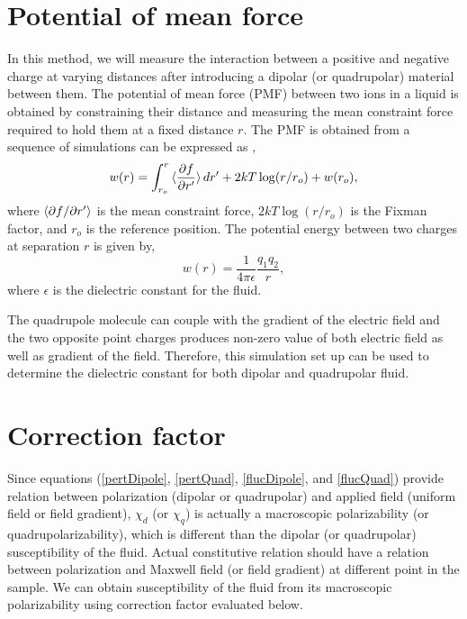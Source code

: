\section{Potential of mean force}
In this method, we will measure the interaction between a positive and negative charge at varying distances after introducing a dipolar (or quadrupolar) material between them. The potential of mean force (PMF) between two ions in a liquid is obtained by constraining their distance and measuring the mean constraint force required to hold them at a fixed distance $r.$ The PMF  is obtained from a sequence of simulations can be expressed as \cite{Wilfred07},
\begin{equation}
w(r) = \int_{r_o}^{r}\braket{\frac{\partial f}{\partial r'}}dr' + 2kT \log(r/r_o) + w(r_o),
\label{eq:pmf}
\end{equation}
where $\braket{\partial f/\partial r'}$ is the mean constraint force, $2kT \log(r/r_o)$ is the Fixman factor, and $r_o$ is the reference position. The potential energy between two charges at separation $r$ is given by,
\begin{equation}
w(r) = \frac{1}{4\pi\epsilon}\frac{q_1q_2}{r},
\end{equation}
where $\epsilon$ is the dielectric constant for the fluid.

The quadrupole molecule can couple with the gradient of the electric field and the two opposite point charges produces non-zero value of both electric field as well as gradient of the field. Therefore, this simulation set up can be used to determine the dielectric constant for both dipolar and quadrupolar fluid.
\label{sec:PMF}

\section{Correction factor}
\label{sec:corrFactor}
Since equations (\ref{pertDipole}, \ref{pertQuad}, \ref{flucDipole}, and \ref{flucQuad}) provide relation between polarization (dipolar or quadrupolar)  and applied field (uniform field or field gradient), $\chi_d$ (or $ \chi_q$) is actually a macroscopic polarizability (or quadrupolarizability), which is different than the dipolar (or quadrupolar) susceptibility of the fluid. Actual constitutive relation should have a relation between polarization and Maxwell field (or field gradient) at different point in the sample. We can obtain susceptibility of the fluid from its macroscopic polarizability using correction factor evaluated below.

